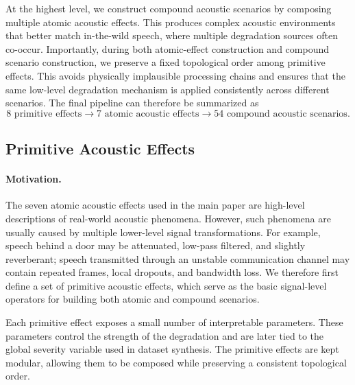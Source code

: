 \documentclass{llmxive}
\begin{document}
At the highest level, we construct compound acoustic scenarios by composing
multiple atomic acoustic effects. This produces complex acoustic environments
that better match in-the-wild speech, where multiple degradation sources often
co-occur. Importantly, during both atomic-effect construction and compound
scenario construction, we preserve a fixed topological order among primitive
effects. This avoids physically implausible processing chains and ensures that
the same low-level degradation mechanism is applied consistently across
different scenarios. The final pipeline can therefore be summarized as
\[
\text{8 primitive effects}
\rightarrow
\text{7 atomic acoustic effects}
\rightarrow
\text{54 compound acoustic scenarios}.
\]
\subsection{Primitive Acoustic Effects}

\paragraph{Motivation.}
The seven atomic acoustic effects used in the main paper are high-level
descriptions of real-world acoustic phenomena. However, such phenomena are
usually caused by multiple lower-level signal transformations. For example,
speech behind a door may be attenuated, low-pass filtered, and slightly
reverberant; speech transmitted through an unstable communication channel may
contain repeated frames, local dropouts, and bandwidth loss. We therefore first
define a set of primitive acoustic effects, which serve as the basic
signal-level operators for building both atomic and compound scenarios.

Each primitive effect exposes a small number of interpretable parameters. These
parameters control the strength of the degradation and are later tied to the
global severity variable used in dataset synthesis. The primitive effects are
kept modular, allowing them to be composed while preserving a consistent
topological order.
\end{document}
